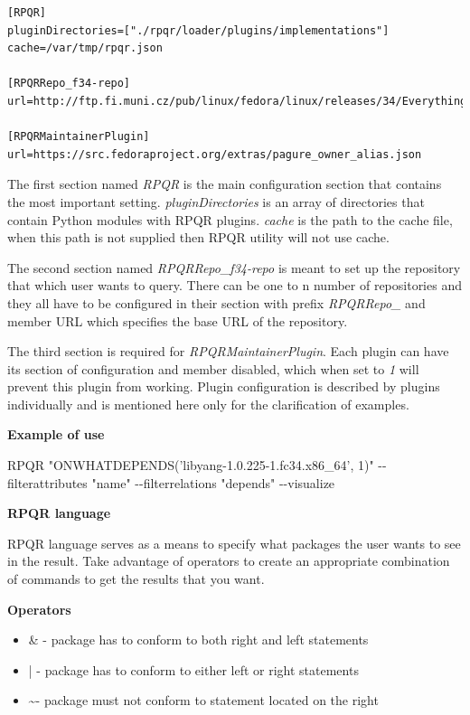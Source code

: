 \begin{lstlisting}
[RPQR]
pluginDirectories=["./rpqr/loader/plugins/implementations"]
cache=/var/tmp/rpqr.json

[RPQRRepo_f34-repo]
url=http://ftp.fi.muni.cz/pub/linux/fedora/linux/releases/34/Everything/x86_64/os/

[RPQRMaintainerPlugin]
url=https://src.fedoraproject.org/extras/pagure_owner_alias.json
\end{lstlisting}

The first section named \textit{RPQR} is the main configuration section that contains the most important
setting. \textit{pluginDirectories} is an array of directories that contain Python modules with RPQR
plugins. \textit{cache} is the path to the cache file, when this path is not supplied then RPQR utility
will not use cache.

The second section named \textit{RPQRRepo\_f34-repo} is meant to set up the repository that which user wants to
query. There can be one to n number of repositories and they all have to be configured in their 
section with prefix \textit{RPQRRepo\_} and member URL which specifies the base URL of the repository.

The third section is required for \textit{RPQRMaintainerPlugin}. Each plugin can have its section
of configuration and member disabled, which when set to \textit{1} will prevent this plugin from
working. Plugin configuration is described by plugins individually and is mentioned here only for
the clarification of examples.

\textbf{Example of use}

RPQR "ONWHATDEPENDS('libyang-1.0.225-1.fc34.x86\_64', 1)" -{}-filterattributes "name" -{}-filterrelations "depends" -{}-visualize

\textbf{RPQR language}

RPQR language serves as a means to specify what packages the user wants to see in the result. Take advantage
of operators to create an appropriate combination of commands to get the results that you want.

\newpage

\textbf{Operators}

\begin{itemize}
  \item \& - package has to conform to both right and left statements
  \item  | - package has to conform to either left or right statements
  \item  \textasciitilde - package must not conform to statement located on the right 
\end{itemize}

